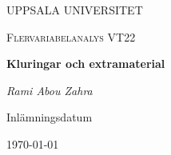 \begin{titlepage}

  \centering
	{\scshape\LARGE UPPSALA UNIVERSITET\par}
	\vspace{1cm}
  {\scshape\Large {Flervariabelanalys VT22} \par}
	\vspace{1.5cm}
  {\huge\bfseries {Kluringar och extramaterial} \par}
	\vspace{2cm}
	{\Large\itshape Rami Abou Zahra \par}
	\vfill
  \vfill


  {\large Inlämningsdatum}\par
  {\today}

\end{titlepage}
